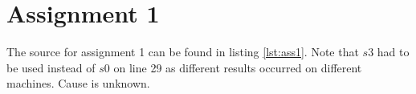 \section{Assignment 1}
The source for assignment 1 can be found in listing \ref{lst:ass1}. Note that
$s3$ had to be used instead of $s0$ on line 29 as different results occurred on
different machines. Cause is unknown.

